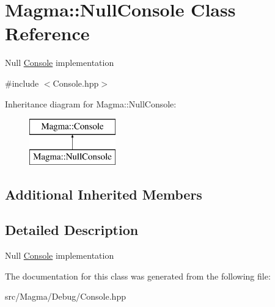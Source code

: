 \hypertarget{class_magma_1_1_null_console}{}\section{Magma\+:\+:Null\+Console Class Reference}
\label{class_magma_1_1_null_console}


Null \hyperlink{class_magma_1_1_console}{Console} implementation  




{\ttfamily \#include $<$Console.\+hpp$>$}

Inheritance diagram for Magma\+:\+:Null\+Console\+:\begin{figure}[H]
\begin{center}
\leavevmode
\includegraphics[height=2.000000cm]{class_magma_1_1_null_console}
\end{center}
\end{figure}
\subsection*{Additional Inherited Members}


\subsection{Detailed Description}
Null \hyperlink{class_magma_1_1_console}{Console} implementation 



The documentation for this class was generated from the following file\+:\begin{DoxyCompactItemize}
\item 
src/\+Magma/\+Debug/Console.\+hpp\end{DoxyCompactItemize}
